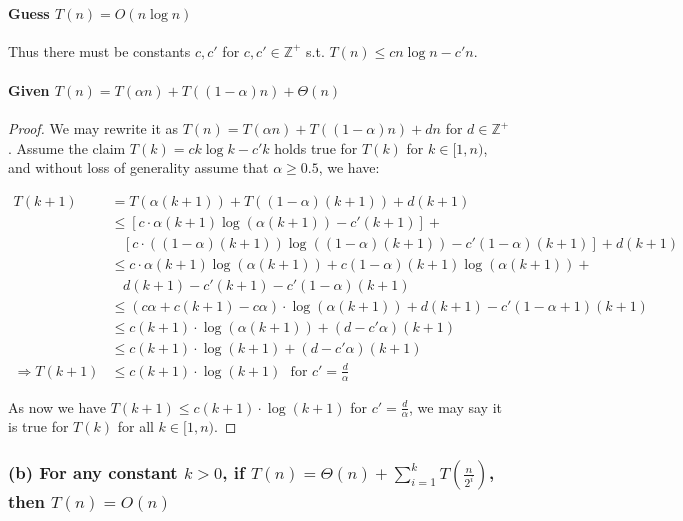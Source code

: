\documentclass[11pt]{article}
\begin{document}
\paragraph{Guess $T(n) = O(n \log n)$\newline}
Thus there must be constants $c, c'$ for $c, c'\in \mathbb{Z^+}$ s.t. $T(n) \leq cn \log n - c'n$.

\paragraph{Given $T(n) = T(\alpha n) + T((1-\alpha)n) + \Theta(n)$\newline}
\begin{proof}
We may rewrite it as $T(n) = T(\alpha n) + T((1-\alpha)n) + dn$ for $d \in \mathbb{Z^+}$. Assume the claim $T(k) = ck \log k - c'k$ holds true for $T(k)$ for $k \in [1, n)$, and without loss of generality assume that $\alpha \geq 0.5$, we have:

\begin{align}
    T(k + 1) &= T(\alpha(k + 1)) + T((1-\alpha)(k+1)) + d(k + 1) \\
    &\leq [c \cdot \alpha (k + 1) \log(\alpha(k + 1)) - c'(k+1)] + \nonumber\\
    & \ \ \ \ [c \cdot ((1- \alpha)(k + 1))\log((1-\alpha)(k + 1)) - c'(1-\alpha)(k + 1)]+ d(k + 1) \nonumber \\
    &\leq c \cdot \alpha (k + 1) \log(\alpha(k + 1)) + c(1-\alpha)(k + 1)\log(\alpha(k+1)) +\nonumber \\
    & \ \ \ \  d(k + 1) - c'(k+1)- c'(1-\alpha)(k + 1) \nonumber \\
    &\leq (c \alpha + c(k + 1) -  c \alpha) \cdot \log(\alpha(k + 1)) +  d(k + 1) -  c'(1-\alpha + 1)(k + 1)\nonumber \\
    &\leq c(k + 1) \cdot \log(\alpha(k + 1)) +  (d-c'\alpha)(k + 1)\nonumber \\
    &\leq c(k + 1) \cdot \log(k + 1)+  (d-c'\alpha)(k + 1)\nonumber \\
    \Longrightarrow T(k + 1) &\leq c(k + 1) \cdot \log(k + 1) \ \ \ \text{for $c'= \frac{d}{\alpha}$}
\end{align}

As now we have $T(k + 1) \leq c(k + 1) \cdot \log(k + 1)$ for $c'= \frac{d}{\alpha}$, we may say it is true for $T(k)$ for all $k \in [1, n)$.
\end{proof}


\subsubsection{(b) For any constant $k > 0$, if $T(n) = \Theta(n) + \sum^{k}_{i = 1} T(\frac{n}{2^i})$, then $T(n) = O(n)$}
\end{document}
